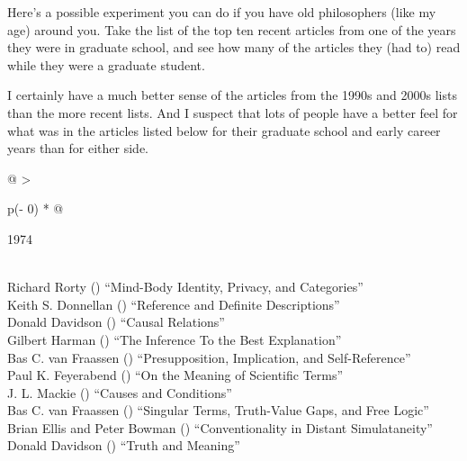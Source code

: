 \documentclass[
  10pt,
  letterpaper,
  DIV=11,
  numbers=noendperiod,
  twoside]{scrartcl}
\begin{document}
Here's a possible experiment you can do if you have old philosophers
(like my age) around you. Take the list of the top ten recent articles
from one of the years they were in graduate school, and see how many of
the articles they (had to) read while they were a graduate student.

I certainly have a much better sense of the articles from the 1990s and
2000s lists than the more recent lists. And I suspect that lots of
people have a better feel for what was in the articles listed below for
their graduate school and early career years than for either side.


\begin{longtable}[]{@{}
  >{\raggedright\arraybackslash}p{(\columnwidth - 0\tabcolsep) * }@{}}

\caption{\label{tbl-top-ten-1965}Most cited articles published less than
ten years ago as of 1974.}

\tabularnewline

\toprule\noalign{}
\begin{minipage}[b]{\linewidth}\raggedright
1974
\end{minipage} \\
\midrule\noalign{}
\endhead
\bottomrule\noalign{}
\endlastfoot
Richard Rorty
()
``Mind-Body Identity, Privacy, and Categories'' \\
Keith S. Donnellan
()
``Reference and Definite Descriptions'' \\
Donald Davidson
()
``Causal Relations'' \\
Gilbert Harman
()
``The Inference To the Best Explanation'' \\
Bas C. van Fraassen
()
``Presupposition, Implication, and Self-Reference'' \\
Paul K. Feyerabend
()
``On the Meaning of Scientific Terms'' \\
J. L. Mackie
()
``Causes and Conditions'' \\
Bas C. van Fraassen
()
``Singular Terms, Truth-Value Gaps, and Free Logic'' \\
Brian Ellis and Peter Bowman
()
``Conventionality in Distant Simulataneity'' \\
Donald Davidson
()
``Truth and Meaning'' \\

\end{longtable}
\end{document}
